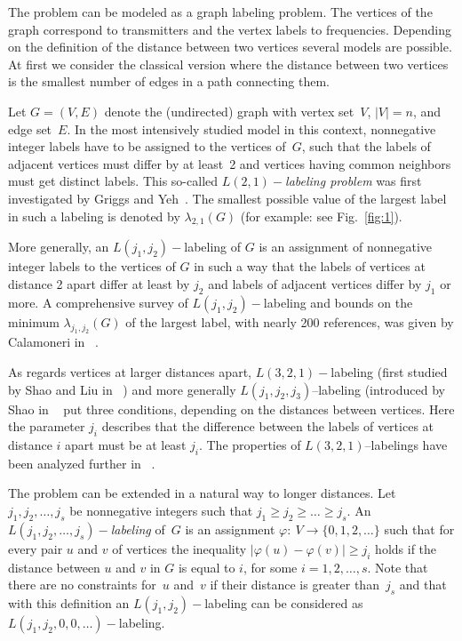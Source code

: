 \documentclass[smallextended]{svjour3}
\begin{document}
The problem can be modeled as a graph labeling problem. The vertices of 
the graph correspond to transmitters and the vertex labels to frequencies. 
Depending on the definition of the distance between two vertices several 
models are possible. At first we consider the classical version where 
the distance between two vertices is the smallest number of edges in a path connecting them. 

Let $G=(V,E)$ denote the (undirected) graph with vertex set~$V$, $|V|=n$, and edge set~$E$. 
In the most intensively studied model in this context, nonnegative 
integer labels have to be assigned to the vertices of~$G$, 
such that the labels of adjacent vertices must differ by at least~2 and 
vertices having common neighbors must get distinct labels. 
This so-called \emph{$L(2,1)-$labeling problem} 
was first investigated by Griggs and Yeh~\cite{GY92}. The smallest 
possible value of the largest label in such a labeling 
is denoted by $\lambda_{2,1}(G)$ (for example: see Fig.~\ref{fig:1}). 

 

More generally, an $L(j_1,j_2)-$labeling of $G$ is an assignment of nonnegative 
integer labels to the vertices of $G$ in such a way that the labels 
of vertices at distance 2 apart differ at least by $j_2$ and labels of adjacent 
vertices differ by $j_1$ or more. 
A comprehensive survey of $L(j_{1},j_{2})-$labeling and bounds on 
the minimum $\lambda_{j_{1},j_{2}}(G)$ of the largest label, with 
nearly 200 references, was given by Calamoneri in ~\cite{3}. 

As regards vertices at larger distances apart, $L(3,2,1)-$labeling 
(first studied by Shao and Liu in ~\cite{4}) and more generally $L(j_{1},j_{2},j_{3})$--labeling (introduced by Shao in ~\cite{5} put three conditions, depending on the distances between vertices. Here the parameter $j_{i}$ describes that the difference between the labels of vertices at distance $i$ apart must be at least $j_{i}$. The properties of $L(3,2,1)$--labelings 
have been analyzed further in ~\cite{6}. 
% 


The problem can be extended in a natural way to longer distances. 
Let $j_1,j_2,\ldots,j_{s}$ be nonnegative integers such that $j_1\geq j_2\geq\ldots\geq j_{s}$. An \emph{$L(j_1,j_2,\ldots,j_{s})-$labeling} of~$G$ is an assignment $\varphi:\: V\rightarrow\{0,1,2,\ldots\}$ such that for every pair $u$ and $v$ of vertices the inequality $|\varphi(u)-\varphi(v)|\geq j_{i}$ holds if the distance between $u$ and $v$ in $G$ is equal to $i$, for some $i=1,2,\ldots,s$. Note that there are no constraints for~$u$ and~$v$ if their 
distance is greater than~$j_s$ and that with this definition an $L(j_1,j_2)-$labeling can be considered as $L(j_1,j_2,0,0,\ldots)-$labeling. 
 
\end{document}
